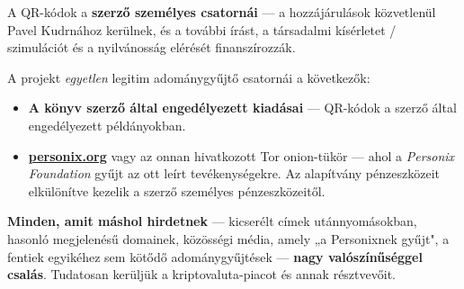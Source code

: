 \begin{minipage}[t]{0.60\textwidth}
\vspace{0pt}
\begin{mdframed}[
  linewidth=0.7pt,roundcorner=5pt,
  innerleftmargin=10pt,innerrightmargin=10pt,
  innertopmargin=8pt,innerbottommargin=8pt,
  skipabove=0pt,skipbelow=0pt,
  linecolor=cbwarning!50,backgroundcolor=cbwarning!5,
  nobreak=true,
  needspace=4\baselineskip,
]
\footnotesize
A QR-kódok a \textbf{szerző személyes csatornái} --- a hozzájárulások közvetlenül Pavel Kudrnához kerülnek, és a további írást, a társadalmi kísérletet / szimulációt és a nyilvánosság elérését finanszírozzák.

\smallskip
A projekt \emph{egyetlen} legitim adománygyűjtő csatornái a következők:

\smallskip
\begin{itemize}
\setlength{\itemsep}{0pt}
\setlength{\topsep}{0pt}
\item \textbf{A könyv szerző által engedélyezett kiadásai} --- QR-kódok a szerző által engedélyezett példányokban.
\item \href{https://personix.org}{\textbf{personix.org}} vagy az onnan hivatkozott Tor onion-tükör --- ahol a \emph{Personix Foundation} gyűjt az ott leírt tevékenységekre. Az alapítvány pénzeszközeit elkülönítve kezelik a szerző személyes pénzeszközeitől.
\end{itemize}

\smallskip
\textbf{Minden, amit máshol hirdetnek} --- kicserélt címek utánnyomásokban, hasonló megjelenésű domainek, közösségi média, amely „a Personixnek gyűjt", a fentiek egyikéhez sem kötődő adománygyűjtések --- \textbf{nagy valószínűséggel csalás}. Tudatosan kerüljük a kriptovaluta-piacot és annak résztvevőit.
\end{mdframed}
\end{minipage}

\clearpage
